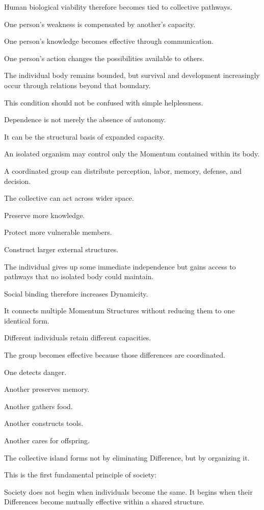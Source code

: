 Human biological viability therefore becomes tied to collective pathways.

One person’s weakness is compensated by another’s capacity.

One person’s knowledge becomes effective through communication.

One person’s action changes the possibilities available to others.

The individual body remains bounded, but survival and development increasingly occur through relations beyond that boundary.

This condition should not be confused with simple helplessness.

Dependence is not merely the absence of autonomy.

It can be the structural basis of expanded capacity.

An isolated organism may control only the Momentum contained within its body.

A coordinated group can distribute perception, labor, memory, defense, and decision.

The collective can act across wider space.

Preserve more knowledge.

Protect more vulnerable members.

Construct larger external structures.

The individual gives up some immediate independence but gains access to pathways that no isolated body could maintain.

Social binding therefore increases Dynamicity.

It connects multiple Momentum Structures without reducing them to one identical form.

Different individuals retain different capacities.

The group becomes effective because those differences are coordinated.

One detects danger.

Another preserves memory.

Another gathers food.

Another constructs tools.

Another cares for offspring.

The collective island forms not by eliminating Difference, but by organizing it.

This is the first fundamental principle of society:

Society does not begin when individuals become the same. It begins when their Differences become mutually effective within a shared structure.

